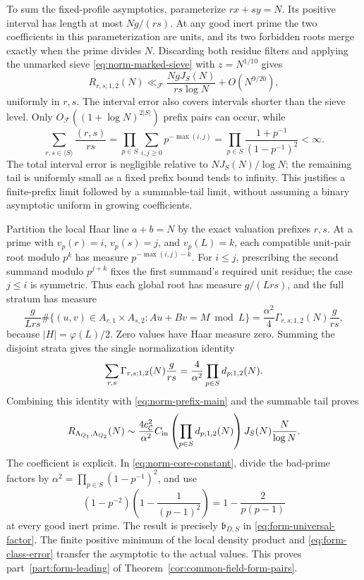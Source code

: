 To sum the fixed-profile asymptotics, parameterize \(rx+sy=N\).
Its positive interval has length at most \(Ng/(rs)\). At any good
inert prime the two coefficients in this parameterization are units,
and its two forbidden roots merge exactly when the prime divides
\(N\). Discarding both residue filters and applying the unmarked
sieve \eqref{eq:norm-marked-sieve} with \(z=N^{1/10}\) gives
\begin{equation}\label{eq:norm-prefix-tail}
 R_{r,s;1,2}(N)\ll_{\mathcal F}
       \frac{NgJ_S(N)}{rs\log N}+O(N^{9/20}),
\end{equation}
uniformly in \(r,s\). The interval error also covers intervals shorter
than the sieve level. Only
\(O_{\mathcal F}((1+\log N)^{2|S|})\) prefix pairs can occur, while
\[
 \sum_{r,s\in\langle S\rangle}\frac{(r,s)}{rs}
 =\prod_{p\in S}\sum_{i,j\ge0}p^{-\max(i,j)}
 =\prod_{p\in S}\frac{1+p^{-1}}{(1-p^{-1})^2}<\infty.
\]
The total interval error is negligible relative to
\(NJ_S(N)/\log N\); the remaining tail is uniformly small as a fixed
prefix bound tends to infinity. This justifies a finite-prefix limit
followed by a summable-tail limit, without assuming a binary
asymptotic uniform in growing coefficients.

Partition the local Haar line \(a+b=N\) by the exact valuation
prefixes \(r,s\). At a prime with \(v_p(r)=i\), \(v_p(s)=j\), and
\(v_p(L)=k\), each compatible unit-pair root modulo \(p^k\) has
measure \(p^{-\max(i,j)-k}\). For \(i\le j\), prescribing the
second summand modulo \(p^{j+k}\) fixes the first summand's required
unit residue; the case \(j\le i\) is symmetric. Thus each global root
has measure \(g/(Lrs)\), and the full stratum has measure
\[
 \frac g{Lrs}
  \#\{(u,v)\in A_{r,1}\times A_{s,2}:Au+Bv=M\bmod L\}
 =\frac{\alpha^2}{4}\Gamma_{r,s;1,2}(N)\frac g{rs},
\]
because \(|H|=\varphi(L)/2\). Zero values have Haar measure zero.
Summing the disjoint strata gives the single normalization identity
\begin{equation}\label{eq:form-haar-strata}\csname ltx@label\endcsname{eq:norm-haar-strata}
 \sum_{r,s}\Gamma_{r,s;1,2}(N)\frac g{rs}
             =\frac4{\alpha^2}\prod_{p\in S}d_{p;1,2}(N).
\end{equation}
Combining this identity with \eqref{eq:norm-prefix-main} and the
summable tail proves
\[
 R_{\Lambda_{Q_1},\Lambda_{Q_2}}(N)\sim
 \frac{4c_{\mathcal C}^2}{\alpha^2}C_{\rm in}
       \left(\prod_{p\in S}d_{p;1,2}(N)\right)
                              J_S(N)\frac N{\log N}.
\]
The coefficient is explicit. In \eqref{eq:norm-core-constant},
divide the bad-prime factors by
\(\alpha^2=\prod_{p\in S}(1-p^{-1})^2\), and use
\[
 (1-p^{-2})\left(1-\frac1{(p-1)^2}\right)
                         =1-\frac2{p(p-1)}
\]
at every good inert prime. The result is precisely
\(\mathfrak b_{D,S}\) in \eqref{eq:form-universal-factor}.
The finite positive minimum of the local density product and
\eqref{eq:form-class-error} transfer the asymptotic to the actual
values. This proves part~\ref{part:form-leading} of
Theorem~\ref{cor:common-field-form-pairs}.
